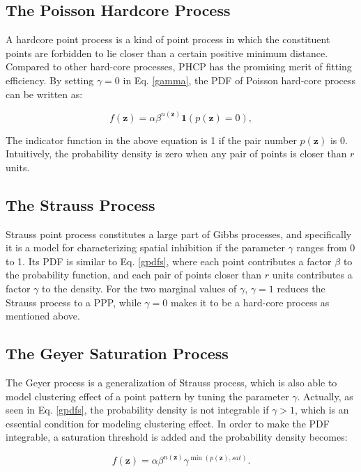 \subsection*{The Poisson Hardcore Process}
A hardcore point process is a kind of point process in which the constituent points are forbidden to lie closer than a certain positive minimum distance. Compared to other hard-core processes, PHCP has the promising merit of fitting efficiency. By setting $\gamma=0$ in Eq. \eqref{gamma}, the PDF of Poisson hard-core process can be written as:

\begin{equation} \label{hardcore}
f(\mathbf{z})=\alpha\beta^{n(\mathbf{z})}\boldsymbol{1}(p(\mathbf{z})=0),
\end{equation}

The indicator function in the above equation is 1 if the pair number $p(\mathbf{z})$ is 0. Intuitively, the probability density is zero when any pair of points is closer than $r$ units.

\subsection*{The Strauss Process}
Strauss point process constitutes a large part of Gibbs processes, and specifically it is a model for characterizing spatial inhibition if the parameter $\gamma$ ranges from 0 to 1. Its PDF is similar to Eq. \eqref{gpdfs}, where each point contributes a factor $\beta$ to the probability function, and each pair of points closer than $r$ units contributes a factor $\gamma$ to the density. For the two marginal values of $\gamma$, $\gamma=1$ reduces the Strauss process to a PPP, while $\gamma=0$ makes it to be a hard-core process as mentioned above.

\subsection*{The Geyer Saturation Process}
The Geyer process is a generalization of Strauss process, which is also able to model clustering effect of a point pattern by tuning the parameter $\gamma$. Actually, as seen in Eq. \eqref{gpdfs}, the probability density is not integrable if $\gamma>1$, which is an essential condition for modeling clustering effect. In order to make the PDF integrable, a saturation threshold is added and the probability density becomes:

\begin{equation} \label{geyer}
f(\mathbf{z})=\alpha\beta^{n(\mathbf{z})}\gamma^{\min(p(\mathbf{z}),sat)}.
\end{equation}

